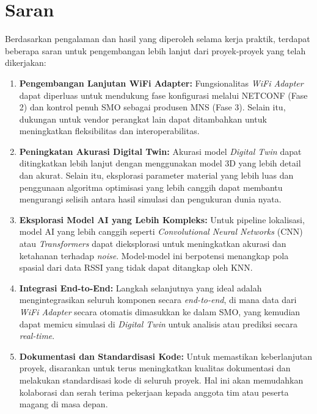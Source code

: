 \section{Saran}
Berdasarkan pengalaman dan hasil yang diperoleh selama kerja praktik, terdapat beberapa saran untuk pengembangan lebih lanjut dari proyek-proyek yang telah dikerjakan:
\begin{enumerate}
    \item \textbf{Pengembangan Lanjutan WiFi Adapter:}
    Fungsionalitas \textit{WiFi Adapter} dapat diperluas untuk mendukung fase konfigurasi melalui NETCONF (Fase 2) dan kontrol penuh SMO sebagai produsen MNS (Fase 3). Selain itu, dukungan untuk vendor perangkat lain dapat ditambahkan untuk meningkatkan fleksibilitas dan interoperabilitas.

    \item \textbf{Peningkatan Akurasi Digital Twin:}
    Akurasi model \textit{Digital Twin} dapat ditingkatkan lebih lanjut dengan menggunakan model 3D yang lebih detail dan akurat. Selain itu, eksplorasi parameter material yang lebih luas dan penggunaan algoritma optimisasi yang lebih canggih dapat membantu mengurangi selisih antara hasil simulasi dan pengukuran dunia nyata.

    \item \textbf{Eksplorasi Model AI yang Lebih Kompleks:}
    Untuk pipeline lokalisasi, model AI yang lebih canggih seperti \textit{Convolutional Neural Networks} (CNN) atau \textit{Transformers} dapat dieksplorasi untuk meningkatkan akurasi dan ketahanan terhadap \textit{noise}. Model-model ini berpotensi menangkap pola spasial dari data RSSI yang tidak dapat ditangkap oleh KNN.

    \item \textbf{Integrasi End-to-End:}
    Langkah selanjutnya yang ideal adalah mengintegrasikan seluruh komponen secara \textit{end-to-end}, di mana data dari \textit{WiFi Adapter} secara otomatis dimasukkan ke dalam SMO, yang kemudian dapat memicu simulasi di \textit{Digital Twin} untuk analisis atau prediksi secara \textit{real-time}.

    \item \textbf{Dokumentasi dan Standardisasi Kode:}
    Untuk memastikan keberlanjutan proyek, disarankan untuk terus meningkatkan kualitas dokumentasi dan melakukan standardisasi kode di seluruh proyek. Hal ini akan memudahkan kolaborasi dan serah terima pekerjaan kepada anggota tim atau peserta magang di masa depan.
\end{enumerate}
